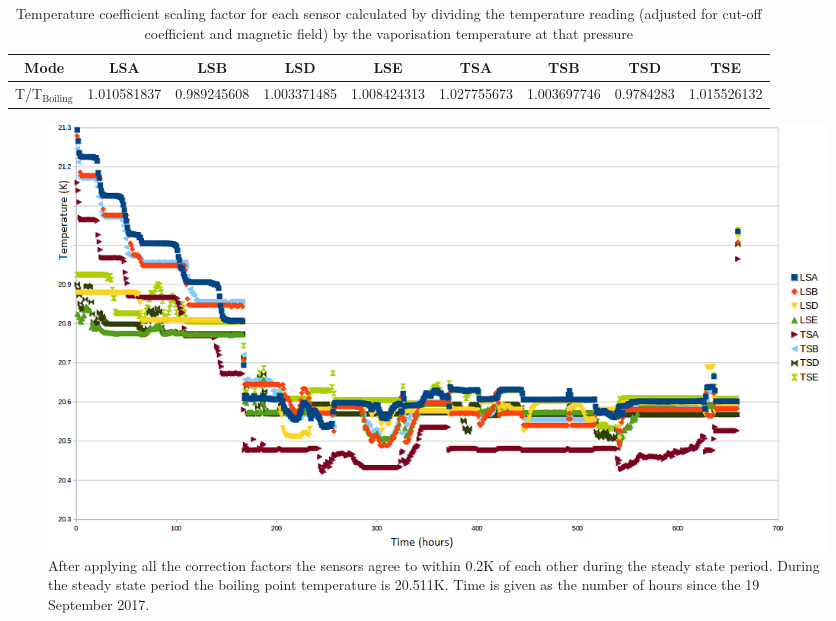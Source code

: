  \begin{table}
\scriptsize
  \caption{
    Temperature coefficient scaling factor for each sensor calculated by dividing the temperature reading (adjusted for cut-off coefficient and magnetic field) by the vaporisation temperature at that pressure
  }
  \label{tab:temperature}
  \begin{center}
    \begin{tabular}{|c c c c c c c c c|}
    \hline

Mode      & LSA & LSB & LSD & LSE & TSA & TSB & TSD & TSE     \rule{0pt}{10pt} \\
\hline
T/T${}_\textrm{Boiling}$ &  1.010581837 & 0.989245608 & 1.003371485 & 1.008424313 & 1.027755673 & 1.003697746 & 0.9784283 & 1.015526132\\

    \hline
    \end{tabular}
  \end{center}
\end{table} 

  \begin{figure}[htb!]
  \begin{center}
    \includegraphics[width=1\textwidth]{TempCalibrated.png}
  \end{center}
  \caption{
    After applying all the correction factors the sensors agree to within 0.2K of each other during the steady state period. During the steady state period the boiling point temperature is 20.511K. Time is given as the number of hours since the 19 September 2017.
  }
  \label{Fig:TempCalibrated}
\end{figure}
 

